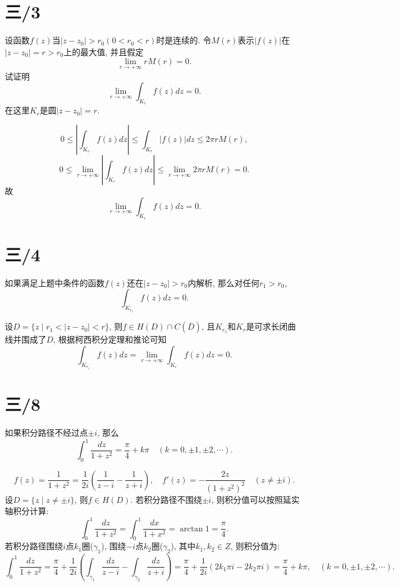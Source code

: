 \documentclass[11pt,a4paper]{article}
\author{刘逸灏 (515370910207)}
\begin{document}
\maketitle

\section{三/3}
\begin{problem}
设函数$f(z)$当$|z-z_0|>r_0(0<r_0<r)$时是连续的. 令$M(r)$表示$|f(z)|$在$|z-z_0|=r>r_0$上的最大值, 并且假定
$$\lim_{r\to+\infty} rM(r)=0.$$
试证明
$$\lim_{r\to+\infty}\int_{K_r}f(z)dz=0.$$
在这里$K_r$是圆$|z-z_0|=r$.
\end{problem}

$$0\leqslant\left|\int_{K_r}f(z)dz\right|\leqslant\int_{K_r}|f(z)|dz\leqslant2\pi rM(r),$$
$$0\leqslant\lim_{r\to+\infty}\left|\int_{K_r}f(z)dz\right|\leqslant\lim_{r\to+\infty}2\pi rM(r)=0.$$
故$$\lim_{r\to+\infty}\int_{K_r}f(z)dz=0.$$

\section{三/4}
\begin{problem}
如果满足上题中条件的函数$f(z)$还在$|z-z_0|>r_0$内解析, 那么对任何$r_1>r_0$,
$$\int_{K_{r_1}}f(z)dz=0.$$
\end{problem}

设$D=\{z\mid r_1<|z-z_0|<r\}$, 则$f\in H(D)\cap C(\overline{D})$, 且$K_{r_1}$和$K_r$是可求长闭曲线并围成了$D$, 根据柯西积分定理和推论可知
$$\int_{K_{r_1}}f(z)dz=\lim_{r\to+\infty}\int_{K_r}f(z)dz=0.$$

\section{三/8}
\begin{problem}
如果积分路径不经过点$\pm i$, 那么
$$\int_0^1\frac{dz}{1+z^2}=\frac{\pi}{4}+k\pi\quad(k=0,\pm1,\pm2,\cdots).$$
\end{problem}

$$f(z)=\frac{1}{1+z^2}=\frac{1}{2i}\left(\frac{1}{z-i}-\frac{1}{z+i}\right),\quad f'(z)=-\frac{2z}{(1+z^2)^2}\quad (z\neq\pm i).$$
设$D=\{z\mid z\neq\pm i\}$, 则$f\in H(D)$. 若积分路径不围绕$\pm i$, 则积分值可以按照延实轴积分计算:
$$\int_0^1\frac{dz}{1+z^2}=\int_0^1\frac{dx}{1+x^2}=\arctan 1=\frac{\pi}{4}.$$
若积分路径围绕$i$点$k_1$圈($\gamma_1$), 围绕$-i$点$k_2$圈($\gamma_2$), 其中$k_1,k_2\in Z$, 则积分值为:
$$\int_0^1\frac{dz}{1+z^2}=\frac{\pi}{4}+\frac{1}{2i}\left(\int_{\gamma_1}\frac{dz}{z-i}-\int_{\gamma_2}\frac{dz}{z+i}\right)=\frac{\pi}{4}+\frac{1}{2i}(2k_1\pi i-2k_2\pi i)=\frac{\pi}{4}+k\pi,\quad(k=0,\pm1,\pm2,\cdots).$$
\end{document}
